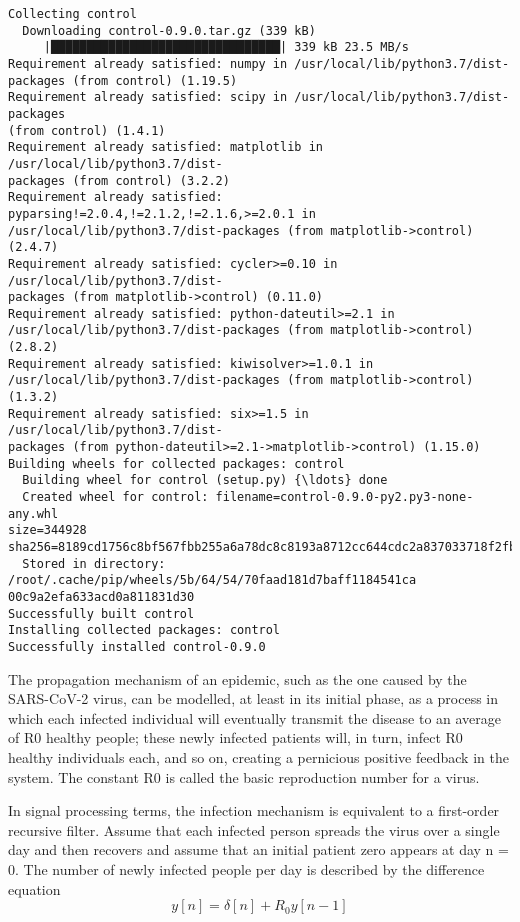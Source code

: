 \documentclass[11pt]{article}
\begin{document}
    \begin{Verbatim}[commandchars=\\\{\}]
Collecting control
  Downloading control-0.9.0.tar.gz (339 kB)
     |████████████████████████████████| 339 kB 23.5 MB/s
Requirement already satisfied: numpy in /usr/local/lib/python3.7/dist-
packages (from control) (1.19.5)
Requirement already satisfied: scipy in /usr/local/lib/python3.7/dist-packages
(from control) (1.4.1)
Requirement already satisfied: matplotlib in /usr/local/lib/python3.7/dist-
packages (from control) (3.2.2)
Requirement already satisfied: pyparsing!=2.0.4,!=2.1.2,!=2.1.6,>=2.0.1 in
/usr/local/lib/python3.7/dist-packages (from matplotlib->control) (2.4.7)
Requirement already satisfied: cycler>=0.10 in /usr/local/lib/python3.7/dist-
packages (from matplotlib->control) (0.11.0)
Requirement already satisfied: python-dateutil>=2.1 in
/usr/local/lib/python3.7/dist-packages (from matplotlib->control) (2.8.2)
Requirement already satisfied: kiwisolver>=1.0.1 in
/usr/local/lib/python3.7/dist-packages (from matplotlib->control) (1.3.2)
Requirement already satisfied: six>=1.5 in /usr/local/lib/python3.7/dist-
packages (from python-dateutil>=2.1->matplotlib->control) (1.15.0)
Building wheels for collected packages: control
  Building wheel for control (setup.py) {\ldots} done
  Created wheel for control: filename=control-0.9.0-py2.py3-none-any.whl
size=344928
sha256=8189cd1756c8bf567fbb255a6a78dc8c8193a8712cc644cdc2a837033718f2fb
  Stored in directory: /root/.cache/pip/wheels/5b/64/54/70faad181d7baff1184541ca
00c9a2efa633acd0a811831d30
Successfully built control
Installing collected packages: control
Successfully installed control-0.9.0
    \end{Verbatim}

    The propagation mechanism of an epidemic, such as the one caused by the
SARS-CoV-2 virus, can be modelled, at least in its initial phase, as a
process in which each infected individual will eventually transmit the
disease to an average of R0 healthy people; these newly infected
patients will, in turn, infect R0 healthy individuals each, and so on,
creating a pernicious positive feedback in the system. The constant R0
is called the basic reproduction number for a virus.

In signal processing terms, the infection mechanism is equivalent to a
first-order recursive filter. Assume that each infected person spreads
the virus over a single day and then recovers and assume that an initial
patient zero appears at day n = 0. The number of newly infected people
per day is described by the difference equation
\[y[n] = δ[n] + R_0y[n − 1]\]
\end{document}

